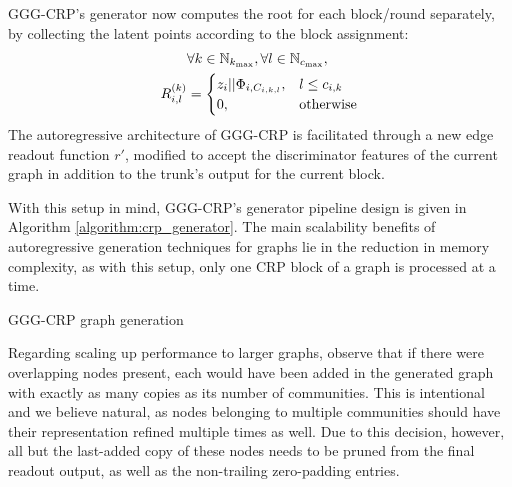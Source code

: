 GGG-CRP's generator now computes the root for each block/round separately, by collecting the latent points according to the block assignment:
\begin{align*}
&\forall k \in \mathbb{N}_{k_{\max}}, \forall l \in \mathbb{N}_{c_{\max}}, \\
R_{i,l}^{\mathopen{}\left(k\right)} &= \begin{cases} z_i||\Phi_{i,C_{i,k,l}}, & l \leq c_{i,k} \\ 0, & \text{otherwise} \end{cases}
\end{align*}
The autoregressive architecture of GGG-CRP is facilitated through a new edge readout function $r'$, modified to accept the discriminator features of the current graph in addition to the trunk's output for the current block. 

With this setup in mind, GGG-CRP's generator pipeline design is given in Algorithm \ref{algorithm:crp_generator}. The main scalability benefits of autoregressive generation techniques for graphs lie in the reduction in memory complexity, as with this setup, only one CRP block of a graph is processed at a time.

\begin{algorithm}[H]
\caption{GGG-CRP graph generation}
\label{algorithm:crp_generator}
\begin{algorithmic}
\ENDFOR
{}
\end{algorithmic}
\end{algorithm} 

Regarding scaling up performance to larger graphs, observe that if there were overlapping nodes present, each would have been added in the generated graph with exactly as many copies as its number of communities. This is intentional and we believe natural, as nodes belonging to multiple communities should have their representation refined multiple times as well. Due to this decision, however, all but the last-added copy of these nodes needs to be pruned from the final readout output, as well as the non-trailing zero-padding entries.

